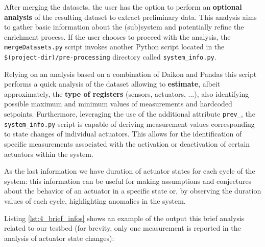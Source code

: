 After merging the datasets, the user has the option to perform an \textbf{optional analysis} of the resulting dataset to extract preliminary data. This analysis aims to gather basic information about the (sub)system and potentially refine the enrichment process. If the user chooses to proceed with the analysis, the \texttt{mergeDatasets.py} script invokes another Python script located in the \texttt{\$(project-dir)/pre-processing} directory called \texttt{system\_info.py}.

Relying on an analysis based on a combination of Daikon and Pandas this script performs a quick analysis of the dataset allowing to \textbf{estimate}, albeit approximately, the \textbf{type of registers} (sensors, actuators, ...), also identifying possible maximum and minimum values of measurements and hardcoded setpoints. Furthermore, leveraging the use of the additional attribute \texttt{prev\_}, the \texttt{system\_info.py} script is capable of deriving measurement values corresponding to state changes of individual actuators. This allows for the identification of specific measurements associated with the activation or deactivation of certain actuators within the system.

As the last information we have duration of actuator states for each cycle of the system: this information can be useful for making assumptions and conjectures about the behavior of an actuator in a specific state or, by observing the duration values of each cycle, highlighting anomalies in the system.

\bigskip
Listing \ref{lst:4_brief_infos} shows an example of the output this brief analysis related to our testbed (for brevity, only one measurement is reported in the analysis of actuator state changes):

